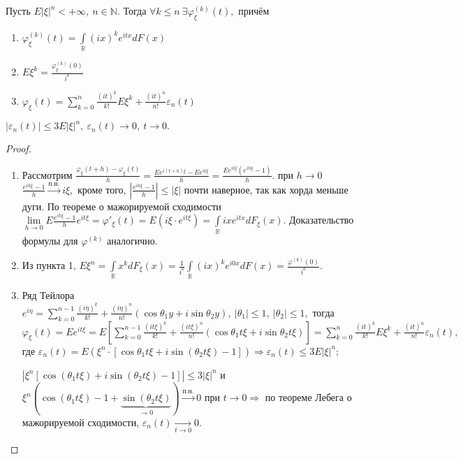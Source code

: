 	\begin{property}
	\begin{theorem}[о производных х.ф.]
		Пусть $E|\xi|^n < + \infty, ~n \in \mathbb{N}.$ Тогда $\forall k \leqslant n~ \exists \varphi_\xi^{(k)}(t),$ причём
		\begin{enumerate}
			\item $\varphi_\xi^{(k)}(t) = \int\limits_\mathbb{R}(ix)^ke^{itx}dF(x)$
			\item $E\xi^k = \frac{\varphi_\xi^{(k)}(0)}{i^k}$
			\item $\varphi_\xi(t) = \sum\limits_{k = 0}^{n} \frac{(it)^k}{k!}E\xi^k + \frac{(it)^n}{n!}\varepsilon_n(t)$
		\end{enumerate}
		$|\varepsilon_n(t)| \leqslant 3E|\xi|^n, ~\varepsilon_n(t) \to 0, ~ t \to 0.$
	\end{theorem}
	\begin{proof}
		\begin{enumerate}
			\item Рассмотрим $\frac{\varphi_\xi(t + h) - \varphi_\xi(t)}{h} = \frac{Ee^{i(t + h)\xi} - Ee^{it\xi}}{h} = \frac{Ee^{it\xi}(e^{ih\xi} - 1)}{h}.$ при $h \to 0$ $\frac{e^{ih\xi} - 1}{h} \overset{\text{п.н.}}{\longrightarrow}i\xi,$ кроме того, $\left|\frac{e^{ih\xi} - 1}{h}\right| \leqslant |\xi|$ почти наверное, так как хорда меньше дуги. По теореме о мажорируемой сходимости
			$\lim\limits_{h \to 0}E \frac{e^{ih\xi} - 1}{h}e^{it\xi} = \varphi'_\xi(t) = E(i\xi\cdot e^{it\xi}) = \int\limits_\mathbb{R} ixe^{itx}dF_\xi(x).$ Доказательство формулы для $\varphi^{(k)}$ аналогично.
			\item Из пункта 1, $E\xi^n = \int\limits_\mathbb{R}x^k dF_\xi(x) = \frac{1}{i^k} \int\limits_\mathbb{R}(ix)^ke^{i0x}dF(x) = \frac{\varphi^{(k)}(0)}{i^k}.$
			\item Ряд Тейлора $e^{i\eta} = \sum\limits_{k = 0}^{n - 1} \frac{(i\eta)^k}{k!} + \frac{(i\eta)^n}{n!}(\cos\theta_1y + i\sin\theta_2 y), ~|\theta_1| \leqslant 1, ~ |\theta_2| \leqslant 1,$ тогда
			$\varphi_\xi(t) = Ee^{it\xi} = E\left[\sum\limits_{k = 0}^{n - 1} \frac{(it\xi)^k}{k!} + \frac{(it\xi)^n}{n!}(\cos\theta_1 t\xi + i\sin \theta_2 t\xi)\right] = \sum\limits_{k = 0}^{n}\frac{(it)^k}{k!}E\xi^k + \frac{(it)^n}{n!}\varepsilon_n(t), $ где $\varepsilon_n(t) = E(\xi^n\cdot [\cos\theta_1t\xi + i\sin(\theta_2 t\xi) - 1]) \Rightarrow \varepsilon_n(t) \leqslant 3E|\xi|^n;$

			$|\xi^n[\cos(\theta_1t\xi) + i\sin(\theta_2t\xi) - 1]| \leqslant3|\xi|^n$ и $\xi^n(\cos(\theta_1t\xi) - 1 + \underbrace{\sin(\theta_2 t\xi)}_{\to 0}) \overset{\text{п.н.}}{\longrightarrow} 0$ при $t \to 0 \Rightarrow$ по теореме Лебега о мажорируемой сходимости, $\varepsilon_n(t) \underset{t \to 0}{\longrightarrow} 0.$
		\end{enumerate}
	\end{proof}
	\end{property}

